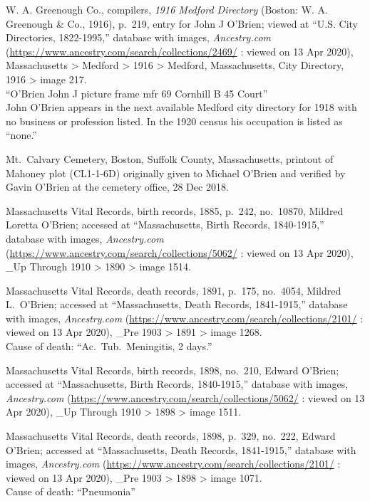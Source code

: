 \begin{thebibliography}{999}
W. A. Greenough Co., compilers, \textit{1916 Medford Directory} (Boston: W. A. Greenough \& Co., 1916), p.\ 219, entry for John J O'Brien; viewed at ``U.S. City Directories, 1822-1995,'' database with images, \textit{Ancestry.com} (\url{https://www.ancestry.com/search/collections/2469/} : viewed on 13 Apr 2020), Massachusetts > Medford > 1916 > Medford, Massachusetts, City Directory, 1916 > image 217.\\
``O'Brien John J picture frame mfr 69 Cornhill B 45 Court''\\
John O'Brien appears in the next available Medford city directory for 1918 with no business or profession listed. In the 1920 census his occupation is listed as ``none.''

Mt.\ Calvary Cemetery, Boston, Suffolk County, Massachusetts, printout of Mahoney plot (CL1-1-6D) originally given to Michael O'Brien and verified by Gavin O'Brien at the cemetery office, 28 Dec 2018.

Massachusetts Vital Records, birth records, 1885, p.\ 242, no.\ 10870, Mildred Loretta O'Brien; accessed at ``Massachusetts, Birth Records, 1840-1915,'' database with images, \textit{Ancestry.com} (\url{https://www.ancestry.com/search/collections/5062/} : viewed on 13 Apr 2020), \_Up Through 1910 > 1890 > image 1514.

Massachusetts Vital Records, death records, 1891, p.\ 175, no.\ 4054, Mildred L.\ O'Brien; accessed at ``Massachusetts, Death Records, 1841-1915,'' database with images, \textit{Ancestry.com} (\url{https://www.ancestry.com/search/collections/2101/} : viewed on 13 Apr 2020), \_Pre 1903 > 1891 > image 1268.\\
Cause of death: ``Ac.\ Tub.\ Meningitis, 2 days.''

Massachusetts Vital Records, birth records, 1898, no.\ 210, Edward O'Brien; accessed at ``Massachusetts, Birth Records, 1840-1915,'' database with images, \textit{Ancestry.com} (\url{https://www.ancestry.com/search/collections/5062/} : viewed on 13 Apr 2020), \_Up Through 1910 > 1898 > image 1511.

Massachusetts Vital Records, death records, 1898, p.\ 329, no.\ 222, Edward O'Brien; accessed at ``Massachusetts, Death Records, 1841-1915,'' database with images, \textit{Ancestry.com} (\url{https://www.ancestry.com/search/collections/2101/} : viewed on 13 Apr 2020), \_Pre 1903 > 1898 > image 1071.\\
Cause of death: ``Pneumonia''


\end{thebibliography}
